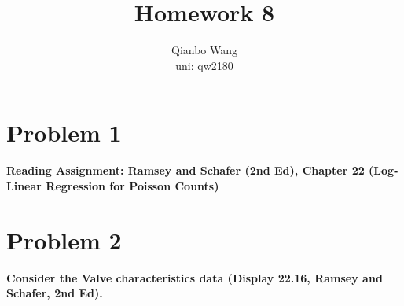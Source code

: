 \documentclass[10pt,letterpaper]{article}
\title{\textbf {Homework 8}}
\author{{Qianbo Wang}\\{uni: qw2180}}
\date{}
\begin{document}
\maketitle
\thispagestyle{fancy}
\vspace{-2em}

\section*{Problem 1}
\textbf{Reading Assignment: Ramsey and Schafer (2nd Ed), Chapter 22 (Log-Linear Regression for Poisson Counts)}

\section*{Problem 2}
\textbf{Consider the Valve characteristics data (Display 22.16, Ramsey and Schafer, 2nd Ed).}\\
\end{document}
